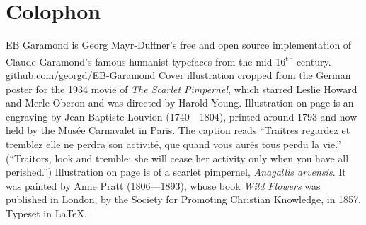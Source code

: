 \documentclass[paper=a5,BCOR=7mm,twoside,DIV=calc,12pt,usegeometry,chapterprefix,endperiod,headings=big]{scrbook}
\begin{document}
\chapter*{Colophon}

\centering
EB Garamond is Georg Mayr-Duffner's free and open source implementation of Claude Garamond's famous humanist typefaces from the mid-16\textsuperscript{th} century. \\github.com/georgd/EB-Garamond
\vfill
Cover illustration cropped from the German poster for the 1934 movie of \textit{The Scarlet Pimpernel}, which starred Leslie Howard and Merle Oberon and was directed by Harold Young.
\vfill
Illustration on page \pageref{guillotine} is an engraving by Jean-Baptiste Louvion (1740---1804), printed around 1793 and now held by the Musée Carnavalet in Paris. The caption reads \enquote{Traitres regardez et tremblez elle ne perdra son activité, que quand vous aurés tous perdu la vie.} (\enquote{Traitors, look and tremble: she will cease her activity only when you have all perished.})
\vfill
Illustration on page \pageref{flowers} is of a scarlet pimpernel, \textit{Anagallis arvensis}. It was painted by Anne Pratt (1806---1893), whose book \textit{Wild Flowers} was published in London, by the Society for Promoting Christian Knowledge, in 1857. 
\vfill
Typeset in \LaTeX{}.
\thispagestyle{empty}
\end{document}
